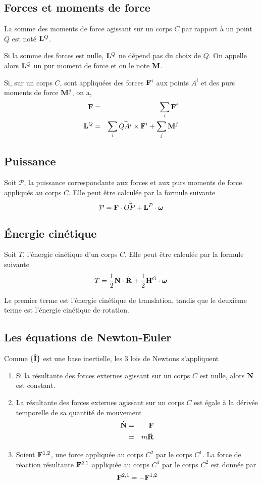 \subsection{Forces et moments de force}
La somme des moments de force agissant sur un corps $C$ par rapport à un point $Q$ est noté ${\bf L}^Q$.

Si la somme des forces est nulle, ${\bf L}^Q$ ne dépend pas du choix de $Q$.
On appelle alors ${\bf L}^Q$ un pur moment de force et on le note ${\bf M}$.

Si, sur un corps $C$, sont appliquées des forces ${\bf F}^i$ aux points $A^i$ et des purs moments de force ${\bf M}^j$, on a,
\begin{eqnarray*}
  {\bf F} &=& \sum_i {\bf F}^i\\
  {\bf L}^Q &=&  \sum_i \vec{QA^i}\times{\bf F}^i + \sum_j {\bf M}^j
\end{eqnarray*}

\subsection{Puissance}
Soit $\mathcal{P}$, la puissance correspondante aux forces et aux purs moments de force appliqués au corps $C$.
Elle peut être calculée par la formule suivante
\[ \mathcal{P} = {\bf F}\cdot\dot{\vec{ OP}} + {\bf L}^P\cdot{\bm \omega} \]

\subsection{\'Energie cinétique}
Soit $T$, l'énergie cinétique d'un corps $C$.
Elle peut être calculée par la formule suivante
\[ T = \frac{1}{2} {\bf N} \cdot \dot{\bf R} + \frac{1}{2} {\bf H}^G \cdot {\bm \omega} \]

Le premier terme est l'énergie cinétique de translation, tandis que le deuxième
terme est l'énergie cinétique de rotation. 

\subsection{Les équations de Newton-Euler}
Comme $\{{\bf\hat{I}}\}$ est une base inertielle, les 3 lois de Newtons s'appliquent
\begin{enumerate}
  \item Si la résultante des forces externes agissant sur un corps $C$ est nulle, alors ${\bf N}$ est constant.
  \item La résultante des forces externes agissant sur un corps $C$ est égale à la dérivée temporelle de sa quantité de mouvement
    \begin{eqnarray*}
      \dot{{\bf N}} &=& {\bf F}\\
                &=& m \ddot{\bf R}
    \end{eqnarray*}
  \item Soient ${\bf F}^{1,2}$, une force appliquée au corps $C^2$ par le corps $C^1$.
    La force de réaction résultante ${\bf F}^{2,1}$ appliquée au corps $C^1$ par le corps $C^2$ est donnée par
    \[ {\bf F}^{2,1} = -{\bf F}^{1,2} \]
\end{enumerate}

